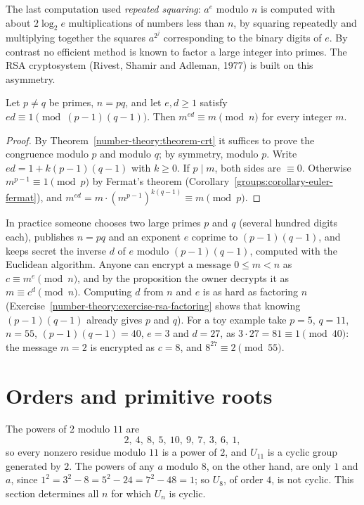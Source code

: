 The last computation used \emph{repeated squaring}: $a^e$ modulo $n$ is computed with about $2\log_2e$ multiplications of numbers less than $n$, by squaring repeatedly and multiplying together the
squares $a^{2^j}$ corresponding to the binary digits of $e$. By contrast no efficient method is known to factor a large integer into primes. The RSA cryptosystem (Rivest, Shamir and Adleman, 1977) is built
on this asymmetry.

\begin{proposition}[RSA]\label{number-theory:proposition-rsa}
Let $p \neq q$ be primes, $n = pq$, and let $e, d \geq 1$ satisfy $ed \equiv 1 \pmod{(p - 1)(q - 1)}$. Then $m^{ed} \equiv m \pmod n$ for every integer $m$.
\end{proposition}

\begin{proof}
By Theorem~\ref{number-theory:theorem-crt} it suffices to prove the congruence modulo $p$ and modulo $q$; by symmetry, modulo $p$. Write $ed = 1 + k(p - 1)(q - 1)$ with $k \geq 0$. If $p \mid m$, both sides
are $\equiv 0$. Otherwise $m^{p-1} \equiv 1 \pmod p$ by Fermat's theorem (Corollary~\ref{groups:corollary-euler-fermat}), and $m^{ed} = m \cdot (m^{p-1})^{k(q-1)} \equiv m \pmod p$.
\end{proof}

In practice someone chooses two large primes $p$ and $q$ (several hundred digits each), publishes $n = pq$ and an exponent $e$ coprime to $(p - 1)(q - 1)$, and keeps secret the inverse $d$ of $e$ modulo
$(p - 1)(q - 1)$, computed with the Euclidean algorithm. Anyone can encrypt a message $0 \leq m < n$ as $c \equiv m^e \pmod n$, and by the proposition the owner decrypts it as $m \equiv c^d \pmod n$.
Computing $d$ from $n$ and $e$ is as hard as factoring $n$ (Exercise~\ref{number-theory:exercise-rsa-factoring} shows that knowing $(p - 1)(q - 1)$ already gives $p$ and $q$). For a toy example take
$p = 5$, $q = 11$, $n = 55$, $(p - 1)(q - 1) = 40$, $e = 3$ and $d = 27$, as $3 \cdot 27 = 81 \equiv 1 \pmod{40}$: the message $m = 2$ is encrypted as $c = 8$, and $8^{27} \equiv 2 \pmod{55}$.

\section{Orders and primitive roots}\label{number-theory:section-primitive-roots}

The powers of $2$ modulo $11$ are
\[
2, \ 4, \ 8, \ 5, \ 10, \ 9, \ 7, \ 3, \ 6, \ 1,
\]
so every nonzero residue modulo $11$ is a power of $2$, and $U_{11}$ is a cyclic group generated by $2$. The powers of any $a$ modulo $8$, on the other hand, are only $1$ and $a$, since
$1^2 = 3^2 - 8 = 5^2 - 24 = 7^2 - 48 = 1$; so $U_8$, of order $4$, is not cyclic. This section determines all $n$ for which $U_n$ is cyclic.

